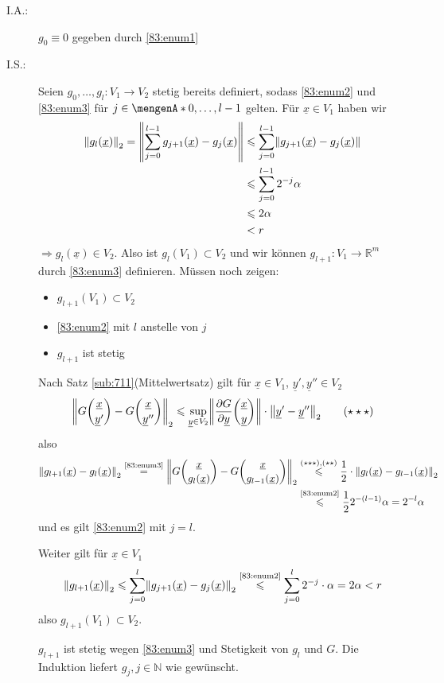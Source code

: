 \begin{description}
	\item[I.A.:] $g_0 \equiv 0 $ gegeben durch \ref{83:enum1}
	\item[I.S.:] Seien $g_0, \ldots , g_l : V_1 \to V_2$ stetig bereits definiert, sodass \ref{83:enum2} und \ref{83:enum3} für $j \in \set{0, \ldots , l-1} $ gelten. Für 
	$\underline{x} \in V_1$ haben wir 
	\begin{align*}
		\norm[2]{g_l (\underline{x})} = \norm{\sum_{j=0}^{l-1} g_{j+1} (\underline{x}) - g_j(\underline{x})}  &\le \sum_{j=0}^{l-1} \norm{g_{j+1}{ (\underline{x}) - g_j(\underline{x})} } \\
		&\le \sum_{j=0}^{l-1} 2^{-j} \alpha  \\ &\le 2 \alpha \\ &< r
	\end{align*}
	$\Rightarrow g_l(\underline{x}) \in V_2$. Also ist $g_l (V_1) \subset V_2$ und wir können $g_{l+1} : V_1  \to \mathds{R}^m$ durch \ref{83:enum3} definieren. Müssen
	noch zeigen: 
	\begin{itemize}
		\item $g_{l+1}(V_1) \subset V_2$
		\item \ref{83:enum2} mit $l$ anstelle von $j$
		\item $g_{l+1}$ ist stetig
	\end{itemize}
	
	Nach Satz \ref{sub:711}(Mittelwertsatz) gilt für $\underline{x} \in V_1$, $\underline{y}', \underline{y}'' \in V_2 $
	\begin{align*}
		\norm[2]{G \binom{\underline{x}}{\underline{y}'} - G \binom{\underline{x}}{\underline{y}''}} \le \sup_{\underline{y} \in V_2} 
		\norm{\diff{G}{\underline{y}} \binom{\underline{x}}{\underline{y}}  } \cdot \norm[2]{\underline{y}' - \underline{y}''} \tag{$\star \star \star$}
	\end{align*}
	also
	\begin{align*}
		\norm[2]{g_{l+1} (\underline{x}) - g_l (\underline{x})}  \stackrel{\text{\ref{83:enum3}}}{=} 
		\norm[2]{G \binom{\underline{x}}{g_l(\underline{x})}   - G \binom{\underline{x}}{g_{l-1} (\underline{x})} } &\stackrel{(\star\star\star),(\star\star)}{\le}
		\frac{1}{2}  \cdot \norm[2]{g_l (\underline{x}) - g_{l-1} (\underline{x})} \\
		&\stackrel{\text{\ref{83:enum2}}}{\le} \frac{1}{2} 2^{-(l-1)} \alpha = 2^{-l} \alpha 
	\end{align*}
	und es gilt \ref{83:enum2} mit $j=l$. 
	
	Weiter gilt für $\underline{x} \in V_1$
	\begin{align*}
		\norm[2]{g_{l+1} (\underline{x})} \le \sum_{j=0}^{l} \norm[2]{g_{j+1} (\underline{x}) - g_j(\underline{x})} \stackrel{\text{\ref{83:enum2}}}{\le} 
		\sum_{j=0}^{l} 2^{-j} \cdot \alpha = 2 \alpha< r    
	\end{align*}
	also $g_{l+1}(V_1) \subset V_2$.
	
	$g_{l+1}$ ist stetig wegen \ref{83:enum3} und Stetigkeit von $g_l$ und $G$. Die Induktion liefert $g_j, j \in \mathds{N}$ wie gewünscht.
\end{description}
